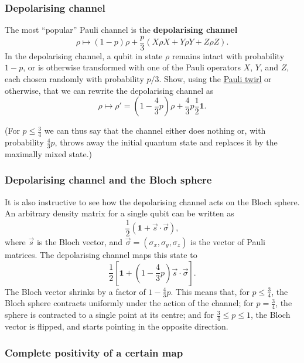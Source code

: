 \documentclass[fleqn]{article}
\begin{document}
\hypertarget{depolarising-channel}{%
\subsubsection{Depolarising channel}\label{depolarising-channel}}

The most ``popular'' Pauli channel is the \textbf{depolarising channel}
\[
  \rho\longmapsto (1-p)\rho + \frac{p}{3}\left(X\rho X+Y\rho Y+Z\rho Z\right).
\]
In the depolarising channel, a qubit in state \(\rho\) remains intact with probability \(1-p\), or is otherwise transformed with one of the Pauli operators \(X\), \(Y\), and \(Z\), each chosen randomly with probability \(p/3\).
Show, using the \protect\hyperlink{puali-twirl}{Pauli twirl} or otherwise, that we can rewrite the depolarising channel as
\[
  \rho \longmapsto \rho'
  = \left(1-\frac{4}{3} p\right) \rho + \frac{4}{3}p\frac{1}{2}\mathbf{1}.
\]

(For \(p\leqslant\frac{3}{4}\) we can thus say that the channel either does nothing or, with probability \(\frac{4}{3}p\), throws away the initial quantum state and replaces it by the maximally mixed state.)

\hypertarget{depolarising-channel-and-the-bloch-sphere}{%
\subsubsection{Depolarising channel and the Bloch sphere}\label{depolarising-channel-and-the-bloch-sphere}}

It is also instructive to see how the depolarising channel acts on the Bloch sphere.
An arbitrary density matrix for a single qubit can be written as
\[
  \frac{1}{2}(\mathbf{1}+\vec{s}\cdot\vec{\sigma}),
\]
where \(\vec{s}\) is the Bloch vector, and \(\vec{\sigma}=(\sigma_x,\sigma_y,\sigma_z)\) is the vector of Pauli matrices.
The depolarising channel maps this state to
\[
  \frac{1}{2}\left[
    \mathbf{1}+ \left(1-\frac{4}{3}p\right)\vec{s}\cdot\vec{\sigma}
  \right].
\]
The Bloch vector shrinks by a factor of \(1-\frac{4}{3}p\).
This means that, for \(p\leqslant\frac{3}{4}\), the Bloch sphere contracts uniformly under the action of the channel;
for \(p=\frac{3}{4}\), the sphere is contracted to a single point at its centre;
and for \(\frac{3}{4}\leqslant p\leqslant 1\), the Bloch vector is flipped, and starts pointing in the opposite direction.

\hypertarget{complete-positivity-of-a-certain-map}{%
\subsubsection{Complete positivity of a certain map}\label{complete-positivity-of-a-certain-map}}
\end{document}

